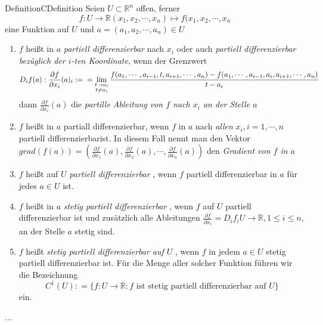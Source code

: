 \begin{ibox}[]{Definition}{CDefinition}
    Seien $ U \subset \mathbb{R}^n  $ offen, ferner 
	$$ f:U \to \mathbb{R}  (x_1,x_2,\cdots,x_{n}) \mapsto f(x_1,x_2, \cdots, x_{n} $$
     eine Funktion auf $ U $ und $ a = (a_1,a_2, \cdots, a_{n}) \in U $ 
	 \begin{enumerate}[label=\alph*)]
	 	\item $ f $ heißt in $ a $ \textit{partiell differenzierbar} nach $ x_i $ oder auch \textit{partiell 
			differenzierbar bezüglich der $ i $-ten Koordinate}, wenn der Grenzwert 
			$$	
				 D_{i}f(a): \frac{\partial f}{\partial x_{i}} (a)_i := \\= 
				\lim_{\substack{t \to a_{i} \\ t \neq  a_i}} \frac{f(a_1,\cdots ,
			a_{i-1}, t, a_{i+1}, \cdots , a_n) - f(a_1,\cdots ,a_{i-1}, a_i, a_{i+1}, \cdots , a_n) }{t-a_i}  
			$$	
			dann $ \frac{\partial f}{\partial x_i} (a) $ die \textit{partille Ableitung von $ f $ nach $ x_i $ an der 
			Stelle $ a $ } 
		\item $ f $ heißt in $ a $ partiall differenzierbar, wenn $ f $ in $ a $ nach \textit{ allen} $ x_i, i = 1,\cdots,n$ 
			partiell differenzierbarist. In diesem Fall nennt man den Vektor $ grad(f(a)) = \left( 
			\frac{\partial f}{\partial x_1}(a), \frac{\partial f}{\partial x_2}(a), \cdots ,
			\frac{\partial f}{\partial x_n}(a) \right)  $ den \textit{Gradient von $ f $ in $ a $ } 
		\item $ f $ heißt auf $ U $ \textit{ partiell differenzierbar }, wenn $ f $ partiell differenzierbar in $ a $ 
			für jedes $ a \in  U $ ist.
		\item $ f $ heißt in $ a $ \textit{stetig partiell differenzierbar} , wenn $ f $ auf $ U $ partiell differenzierbar
			ist und zusätzlich alle Ableitungen $ \frac{\partial f}{\partial x_{i}}  = D_i f_{i} U \to \mathbb{R} , 
			1 \leq i \leq  n$, an der Stelle $ a $ stetig sind.
		\item $ f $ heißt \textit{stetig partiell differenzierbar auf $ U $ }, wenn $ f  $ in jedem $ a \in  U $ stetig 
			partiell differenzierbar ist. Für die Menge aller solcher Funktion führen wir die Bezeichnung 
			$$ C^{1}(U) : = \{f: U \to \mathbb{R} : f \text{ ist stetig partiell differenzierbar auf } U\} $$ ein.
	 \end{enumerate}
\end{ibox}
... 
